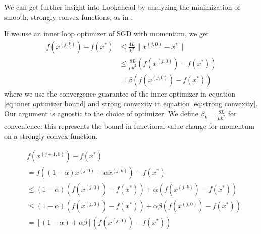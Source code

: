 
We can get further insight into Lookahead by analyzing the minimization of smooth, strongly convex functions, as in \citet{o2015adaptive}. %

If we use an inner loop optimizer of SGD with momentum, we get 
\begin{align}
    f(x^{(j,  k)}) - f(x^*) 
    &\leq \frac{4L}{k^2} \|x^{(j,  0)} - x^*\|  \label{eq:inner optimizer bound} \\
    &\leq \frac{8L}{\mu k^2} (f(x^{(j,  0)}) - f(x^*)) \label{eq:strong convexity} \\
    &= \beta (f(x^{(j,  0)}) - f(x^*)) 
\end{align}
where we use the convergence guarantee of the inner optimizer in equation \eqref{eq:inner optimizer bound} and strong convexity in equation \eqref{eq:strong convexity}. Our argument is agnostic to the choice of optimizer. We define $\beta_k = \frac{8L}{\mu k^2}$ for convenience: this represents the bound in functional value change for momentum on a strongly convex function.

\begin{align}
    & f(x^{(j + 1, 0)}) - f(x^*) \\
    &= f((1 - \alpha) x^{(j,  0)} + \alpha x^{(j, k)}) - f(x^*) \\
    &\leq (1 - \alpha) (f(x^{(j,  0)}) - f(x^*)) + \alpha (f(x^{(j,  k)}) - f(x^*)) \\
    &\leq (1 - \alpha) (f(x^{(j,  0)}) - f(x^*)) +  \alpha \beta (f(x^{(j,  0)}) - f(x^*)) \\ 
    &= [(1 - \alpha) +  \alpha \beta] (f(x^{(j,  0)}) - f(x^*))  
\end{align}


